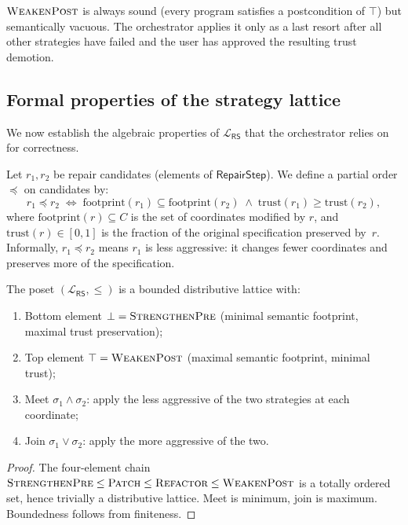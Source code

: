 \documentclass[11pt]{article}
\newcommand{\RS}{\mathsf{RS}}               %
\newcommand{\Patch}{\textsc{Patch}}
\newcommand{\Refactor}{\textsc{Refactor}}
\newcommand{\StrengthenPre}{\textsc{StrengthenPre}}
\newcommand{\WeakenPost}{\textsc{WeakenPost}}
\begin{document}
\begin{remark}
$\WeakenPost$ is always sound (every program satisfies a postcondition of
$\top$) but semantically vacuous.  The orchestrator applies it only as a last
resort after all other strategies have failed and the user has approved the
resulting trust demotion.
\end{remark}

\subsection{Formal properties of the strategy lattice}
\label{subsec:lattice-properties}

We now establish the algebraic properties of $\mathcal{L}_\RS$ that the
orchestrator relies on for correctness.

\begin{definition}
\label{def:repair-ordering}
Let $r_1, r_2$ be repair candidates (elements of $\mathsf{RepairStep}$).
We define a partial order $\preceq$ on candidates by:
\[
  r_1 \preceq r_2
  \;\iff\;
  \mathrm{footprint}(r_1) \subseteq \mathrm{footprint}(r_2)
  \;\wedge\;
  \mathrm{trust}(r_1) \geq \mathrm{trust}(r_2),
\]
where $\mathrm{footprint}(r) \subseteq C$ is the set of coordinates modified
by $r$, and $\mathrm{trust}(r) \in [0,1]$ is the fraction of the original
specification preserved by~$r$.  Informally, $r_1 \preceq r_2$ means $r_1$
is less aggressive: it changes fewer coordinates and preserves more of the
specification.
\end{definition}

\begin{proposition}
\label{prop:lattice-structure}
The poset $(\mathcal{L}_\RS, \leq)$ is a bounded distributive lattice with:
\begin{enumerate}
  \item Bottom element $\bot = \StrengthenPre$ (minimal semantic footprint,
        maximal trust preservation);
  \item Top element $\top = \WeakenPost$ (maximal semantic footprint,
        minimal trust);
  \item Meet $\sigma_1 \wedge \sigma_2$: apply the less aggressive of the
        two strategies at each coordinate;
  \item Join $\sigma_1 \vee \sigma_2$: apply the more aggressive of the two.
\end{enumerate}
\end{proposition}
\begin{proof}
The four-element chain $\StrengthenPre \leq \Patch \leq \Refactor \leq
\WeakenPost$ is a totally ordered set, hence trivially a distributive
lattice.  Meet is minimum, join is maximum.  Boundedness follows from
finiteness.
\end{proof}
\end{document}
